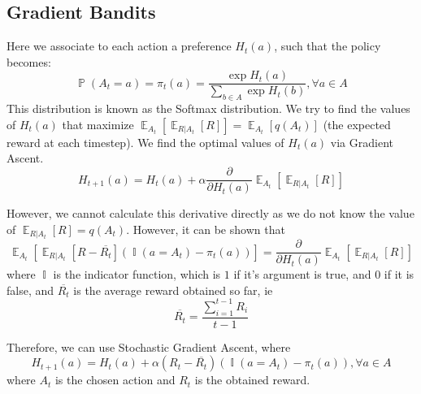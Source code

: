 \documentclass[12pt]{report}
\begin{document}
\subsection{Gradient Bandits}
Here we associate to each action a preference $H_{t}(a)$, such that the policy becomes:
\begin{equation}
    \mathop{\mathbb{P}}(A_{t} = a) = \pi_{t}(a) = \frac{\exp{H_{t}(a)}}{\sum\limits_{b \in A} \exp{H_{t}(b)}}, \forall a \in A
\end{equation}
This distribution is known as the Softmax distribution. We try to find the values of $H_{t}(a)$ that maximize $\mathop{\mathbb{E}}_{A_{t}}\left[\mathop{\mathbb{E}}_{R | A_{t}}\left[R\right]\right] = \mathop{\mathbb{E}}_{A_{t}}\left[q(A_{t})\right]$ (the expected reward at each timestep). 
We find the optimal values of $H_{t}(a)$ via Gradient Ascent.
\begin{equation}
    H_{t + 1}(a) = H_{t}(a) + \alpha \frac{\partial}{\partial H_{t}(a)} \mathop{\mathbb{E}}_{A_{t}}\left[\mathop{\mathbb{E}}_{R | A_{t}}\left[R\right]\right]
\end{equation}

However, we cannot calculate this derivative directly as we do not know the value of $\mathop{\mathbb{E}}_{R | A_{t}}\left[R\right] = q(A_{t})$. However, it can be shown that
\begin{equation}
    \mathop{\mathbb{E}}_{A_{t}}\left[\mathop{\mathbb{E}}_{R | A_{t}}\left[R - \overline{R_{t}}\right](\mathop{\mathbb{I}}(a = A_{t}) - \pi_{t}(a))\right] = \frac{\partial}{\partial H_{t}(a)}\mathop{\mathbb{E}}_{A_{t}}\left[\mathop{\mathbb{E}}_{R | A_{t}}\left[R\right]\right]
\end{equation}
where $\mathop{\mathbb{I}}$ is the indicator function, which is $1$ if it's argument is true, and $0$ if it is false, and $\overline{R_{t}}$ is the average reward obtained so far, ie
\begin{equation}
    \overline{R_{t}} = \frac{\sum\limits_{i = 1}^{t - 1} R_{i}}{t - 1}
\end{equation}

Therefore, we can use Stochastic Gradient Ascent, where
\begin{equation}
    H_{t + 1}(a) = H_{t}(a) + \alpha (R_{t} - \overline{R_{t}})(\mathop{\mathbb{I}}(a = A_{t}) - \pi_{t}(a)), \forall a \in A
\end{equation}
where $A_{t}$ is the chosen action and $R_{t}$ is the obtained reward.
\end{document}
